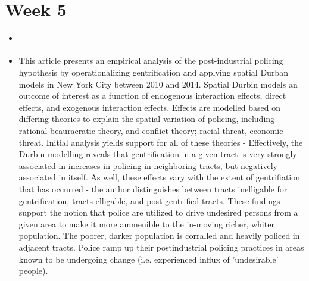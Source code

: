 \documentclass{article}
\begin{document}
\section{Week 5}
\begin{itemize}
  
\item \cite{laniyonu2018CoffeeShops}
\item This article presents an empirical analysis of the post-industrial policing hypothesis by operationalizing gentrification and applying spatial Durban models in New York City between 2010 and 2014. Spatial Durbin models an outcome of interest as a function of endogenous interaction effects, direct effects, and exogenous interaction effects. Effects are modelled based on differing theories to explain the spatial variation of policing, including rational-beauracratic theory, and conflict theory; racial threat, economic threat. Initial analysis yields support for all of these theories - Effectively, the Durbin modelling reveals that gentrification in a given tract is very strongly associated in increases in policing in neighboring tracts, but negatively associated in itself. As well, these effects vary with the extent of gentrifiation that has occurred - the author distinguishes between tracts inelligable for gentrification, tracts elligable, and post-gentrified tracts. These findings support the notion that police are utilized to drive undesired persons from a given area to make it more ammenible to the in-moving richer, whiter population. The poorer, darker population is corralled and heavily policed in adjacent tracts. Police ramp up their postindustrial policing practices in areas known to be undergoing change (i.e. experienced influx of 'undesirable' people).


\end{itemize}
\end{document}
